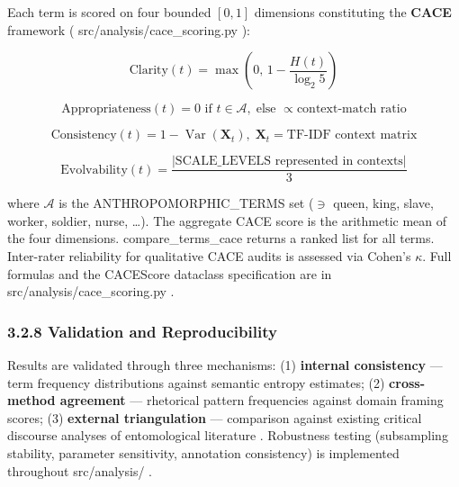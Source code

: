 \documentclass[
]{article}
\numberwithin{equation}{section}
\renewcommand{\texttt}[1]{%
    \colorbox{codebg}{\color{codefg}\ttfamily #1}%
}
\begin{document}
Each term is scored on four bounded \([0,1]\) dimensions constituting
the \textbf{CACE} framework (\texttt{src/analysis/cace\_scoring.py}):

\begin{equation}\label{eq:cace_clarity}
\text{Clarity}(t) = \max\!\left(0,\, 1 - \frac{H(t)}{\log_2 5}\right)
\end{equation}

\begin{equation}\label{eq:cace_appropriateness}
\text{Appropriateness}(t) = 0 \text{ if } t \in \mathcal{A},\; \text{else } \propto \text{context-match ratio}
\end{equation}

\begin{equation}\label{eq:cace_consistency}
\text{Consistency}(t) = 1 - \operatorname{Var}\!\left(\mathbf{X}_t\right),\; \mathbf{X}_t = \text{TF-IDF context matrix}
\end{equation}

\begin{equation}\label{eq:cace_evolvability}
\text{Evolvability}(t) = \frac{|\text{SCALE\_LEVELS represented in contexts}|}{3}
\end{equation}

where \(\mathcal{A}\) is the \texttt{ANTHROPOMORPHIC\_TERMS} set
(\(\ni\) queen, king, slave, worker, soldier, nurse, \ldots). The
aggregate CACE score is the arithmetic mean of the four dimensions.
\texttt{compare\_terms\_cace} returns a ranked list for all terms.
Inter-rater reliability for qualitative CACE audits is assessed via
Cohen's \(\kappa\). Full formulas and the \texttt{CACEScore} dataclass
specification are in \texttt{src/analysis/cace\_scoring.py}.

\subsubsection{3.2.8 Validation and
Reproducibility}\label{validation-and-reproducibility}

Results are validated through three mechanisms: (1) \textbf{internal
consistency} --- term frequency distributions against semantic entropy
estimates; (2) \textbf{cross-method agreement} --- rhetorical pattern
frequencies against domain framing scores; (3) \textbf{external
triangulation} --- comparison against existing critical discourse
analyses of entomological literature \cite{latour1987, longino1990}.
Robustness testing (subsampling stability, parameter sensitivity,
annotation consistency) is implemented throughout
\texttt{src/analysis/}.
\end{document}
